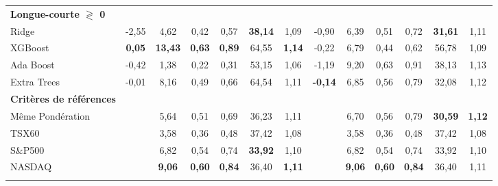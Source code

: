 \documentclass[11pt]{article}
\begin{document}
\begin{table}[h]
{\begin{tabular}{l *{6}{S[table-format=2.2]} | *{6}{S[table-format=2.2]}}
\textbf{Longue-courte $\gtrless$ 0} & & & & & & & & & & & & \\
\addlinespace[0.1cm]
Ridge & -2,55 & 4,62 & 0,42 & 0,57 & \bfseries38,14 & 1,09 & -0,90 & 6,39 & 0,51 & 0,72 & \bfseries31,61 & 1,11 \\ \addlinespace[0.1cm]
XGBoost & \bfseries\color{Green}0,05 & \bfseries13,43 & \bfseries0,63 & \bfseries0,89 & 64,55 & \bfseries1,14 & -0,22 & 6,79 & 0,44 & 0,62 & 56,78 & 1,09 \\ \addlinespace[0.1cm]
Ada Boost & -0,42 & 1,38 & 0,22 & 0,31 & 53,15 & 1,06 & -1,19 & 9,20 & 0,63 & 0,91 & 38,13 & 1,13 \\ \addlinespace[0.1cm]
Extra Trees & -0,01 & 8,16 & 0,49 & 0,66 & 64,54 & 1,11 & \bfseries\color{Green}-0,14 & 6,85 & 0,56 & 0,79 & 32,08 & 1,12 \\ \addlinespace[0.1cm]
\textbf{Critères de références} & & & & & & & & & & & & \\
\addlinespace[0.1cm]
Même Pondération & & 5,64 & 0,51 & 0,69 & 36,23 & 1,11 & & 6,70 & 0,56 & 0,79 & \bfseries\color{Green}30,59 & \bfseries1,12 \\ 
\addlinespace[0.1cm]
TSX60 & & 3,58 & 0,36 & 0,48 & 37,42 & 1,08 & & 3,58 & 0,36 & 0,48 & 37,42 & 1,08 \\ 
\addlinespace[0.1cm]
S\&P500 & & 6,82 & 0,54 & 0,74 & \bfseries\color{Green}33,92 & 1,10 & & 6,82 & 0,54 & 0,74 & 33,92 & 1,10 \\ 
\addlinespace[0.1cm]
NASDAQ & & \bfseries9,06 & \bfseries0,60 & \bfseries0,84 & 36,40 & \bfseries1,11 & & \bfseries9,06 & \bfseries0,60 & \bfseries0,84 & 36,40 & 1,11 \\ 
\addlinespace[0.1cm]
\bottomrule
\midrule
\end{tabular}}
\end{table}


\newpage
\end{document}
